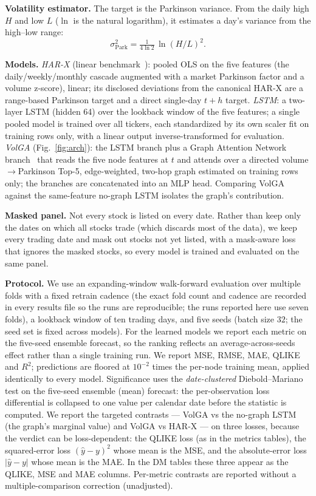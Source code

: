 \documentclass{llncs}
\begin{document}
\textbf{Volatility estimator.} The target is the Parkinson variance. From the daily high $H$ and low
$L$ ($\ln$ is the natural logarithm), it estimates a day's variance from the high--low range:
\[
\sigma^2_{\mathrm{Park}} = \tfrac{1}{4\ln 2}\,\ln(H/L)^2 .
\]

\textbf{Models.} \emph{HAR-X} (linear benchmark~\cite{corsi2009,clements2024}): pooled OLS on the five
features (the daily/weekly/monthly cascade augmented with a market Parkinson factor and a volume
z-score), linear; its disclosed deviations from the canonical HAR-X are a range-based Parkinson target
and a direct single-day $t{+}h$ target. \emph{LSTM}: a two-layer LSTM (hidden 64) over the lookback
window of the five features; a single pooled model is trained over all tickers, each standardized by
its own scaler fit on training rows only, with a linear output inverse-transformed for evaluation. \emph{VolGA}
(Fig.~\ref{fig:arch}): the LSTM branch plus a Graph Attention Network branch~\cite{gat2018} that reads
the five node features at $t$ and attends over a directed volume$\to$Parkinson Top-5, edge-weighted,
two-hop graph estimated on training rows only; the branches are concatenated into an MLP head.
Comparing VolGA against the same-feature no-graph LSTM isolates the graph's contribution.

\textbf{Masked panel.} Not every stock is listed on every date. Rather than keep only the dates on
which all stocks trade (which discards most of the data), we keep every trading date and mask out
stocks not yet listed, with a mask-aware loss that ignores the masked stocks, so every model is
trained and evaluated on the same panel.

\textbf{Protocol.} We use an expanding-window walk-forward evaluation over multiple folds with a fixed
retrain cadence (the exact fold count and cadence are recorded in every results file so the runs are
reproducible; the runs reported here use seven folds), a lookback window of ten trading days, and five
seeds (batch size $32$; the seed set is fixed across models). For the learned models we report each
metric on the five-seed ensemble forecast, so the ranking reflects an average-across-seeds effect
rather than a single training run. We report MSE, RMSE, MAE, QLIKE and $R^2$; predictions are floored
at $10^{-2}$ times the per-node training mean, applied identically to every model. Significance uses
the \emph{date-clustered} Diebold--Mariano test on the five-seed ensemble (mean) forecast: the
per-observation loss differential is collapsed to one value per calendar date before the statistic
is computed. We report the targeted contrasts --- VolGA vs the
no-graph LSTM (the graph's marginal value) and VolGA vs HAR-X --- on three losses, because the
verdict can be loss-dependent: the QLIKE loss (as in the metrics tables), the squared-error loss
$(\hat{y}-y)^2$ whose mean is the MSE, and the absolute-error loss $|\hat{y}-y|$ whose mean is the MAE.
In the DM tables these three appear as the QLIKE, MSE and MAE columns. Per-metric
contrasts are reported without a multiple-comparison correction (unadjusted).
\end{document}
